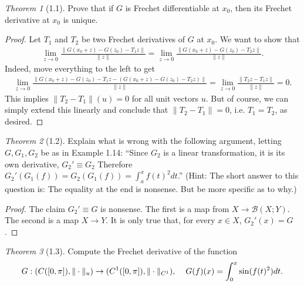 \documentclass[12pt]{article}
\theoremstyle{remark}
\theoremstyle{named}
\newtheorem*{theorem}{Theorem}
\begin{document}
\begin{theorem}[1.1]
    Prove that if \(G\) is Frechet differentiable at \(x_0\), then its Frechet derivative at \(x_0\) is unique.
\end{theorem}

\begin{proof}
    Let \(T_1\) and \(T_2\) be two Frechet derivatives of \(G\) at \(x_0\). We want to show that
    \begin{align*}
        \lim_{z \to 0} \frac{\|G(x_0 + z) - G(z_0) - T_1 z\|}{\|z\|} = \lim_{z \to 0} \frac{\|G(x_0 + z) - G(z_0) - T_2 z\|}{\|z\|}.
    \end{align*}
    Indeed, move everything to the left to get 
    \begin{align*}
        \lim_{z \to 0} \frac{\|G(x_0 + z) - G(z_0) - T_1 z - (G(x_0 + z) - G(z_0) - T_2 z)\|}{\|z\|} = \lim_{z \to 0} \frac{\|T_2 z - T_1 z\|}{\|z\|} = 0.
    \end{align*}
    This implies \(\|T_2 - T_1\|(u) = 0\) for all unit vectors \(u\). But of course, we can simply extend this linearly and conclude that \(\|T_2 - T_1\| = 0\), i.e. \(T_1 = T_2\), as desired.
\end{proof}

\begin{theorem}[1.2]
    Explain what is wrong with the following argument, letting \(G, G_1, G_2\) be as in Example 1.14: ``Since \(G_2\) is a linear transformation, it is its own derivative, \(G_2' \equiv G_2\) Therefore \(G_2'(G_1(f)) = G_2(G_1(f)) = \int_{a}^{x} f(t)^2 dt\).'' (Hint: The short answer to this question is: The equality at the end is nonsense. But be more specific as to why.)
\end{theorem}

\begin{proof}
    The claim \(G_2' \equiv G\) is nonsense. The first is a map from \(X \to \mathcal B (X;Y)\). The second is a map \(X \to Y\). It is only true that, for every \(x \in X\), \(G_2'(x) = G\).
\end{proof}

\begin{theorem}[1.3]
    Compute the Frechet derivative of the function
    \begin{align*}
        G : (C([0, \pi]), \|\cdot\|_u) \to (C^1([0, \pi]), \|\cdot\|_{C^1}), \hspace*{4mm} G(f)(x) = \int_{0}^{x}\sin(f(t)^2) dt.
    \end{align*}
\end{theorem}
\end{document}
